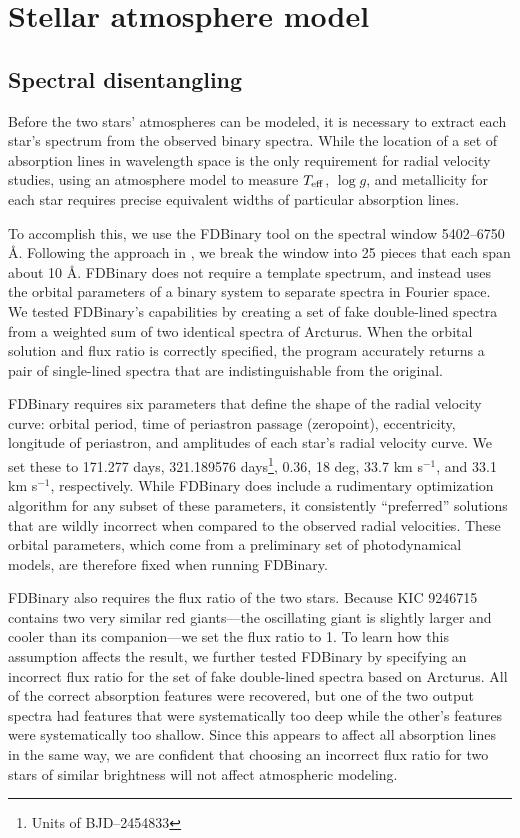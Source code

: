 \section{Stellar atmosphere model}\label{atm}

\subsection{Spectral disentangling}\label{disentangle}
Before the two stars' atmospheres can be modeled, it is necessary to extract each star's spectrum from the observed binary spectra. While the location of a set of absorption lines in wavelength space is the only requirement for radial velocity studies, using an atmosphere model to measure $T_{\rm{eff}}$, $\log g$, and metallicity for each star requires precise equivalent widths of particular absorption lines.

To accomplish this, we use the FDBinary tool \citep{ili04} on the spectral window 5402--6750 \AA. Following the approach in \citet{bec14}, we break the window into 25 pieces that each span about 10 \AA. FDBinary does not require a template spectrum, and instead uses the orbital parameters of a binary system to separate spectra in Fourier space. We tested FDBinary's capabilities by creating a set of fake double-lined spectra from a weighted sum of two identical spectra of Arcturus. When the orbital solution and flux ratio is correctly specified, the program accurately returns a pair of single-lined spectra that are indistinguishable from the original.

FDBinary requires six parameters that define the shape of the radial velocity curve: orbital period, time of periastron passage (zeropoint), eccentricity, longitude of periastron, and amplitudes of each star's radial velocity curve. We set these to 171.277 days, 321.189576 days\footnote{Units of BJD--2454833}, 0.36, 18 deg, 33.7 km s$^{-1}$, and 33.1 km s$^{-1}$, respectively. While FDBinary does include a rudimentary optimization algorithm for any subset of these parameters, it consistently ``preferred'' solutions that are wildly incorrect when compared to the observed radial velocities. These orbital parameters, which come from a preliminary set of photodynamical models, are therefore fixed when running FDBinary.

FDBinary also requires the flux ratio of the two stars. Because KIC 9246715 contains two very similar red giants---the oscillating giant is slightly larger and cooler than its companion---we set the flux ratio to 1. To learn how this assumption affects the result, we further tested FDBinary by specifying an incorrect flux ratio for the set of fake double-lined spectra based on Arcturus. All of the correct absorption features were recovered, but one of the two output spectra had features that were systematically too deep while the other's features were systematically too shallow. Since this appears to affect all absorption lines in the same way, we are confident that choosing an incorrect flux ratio for two stars of similar brightness will not affect atmospheric modeling.

